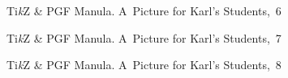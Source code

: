 \documentclass[a4paper,11pt]{article}
\begin{document}
\begin{figure}[ht]

  \centering

  \begin{tikzpicture}











  \end{tikzpicture}

  \caption{Ti\textit{k}Z \& PGF Manula. A~Picture for Karl's Students,~6}

\end{figure}





\begin{figure}[ht]

  \centering

  \begin{tikzpicture}









  \end{tikzpicture}

  \caption{Ti\textit{k}Z \& PGF Manula. A~Picture for Karl's Students,~7}

\end{figure}





\begin{figure}[ht]

  \centering

  \begin{tikzpicture}









  \end{tikzpicture}

  \caption{Ti\textit{k}Z \& PGF Manula. A~Picture for Karl's Students,~8}

\end{figure}
\end{document}
